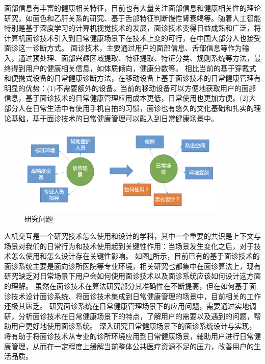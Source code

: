 
面部信息有丰富的健康相关特征\cite{ding2019reading}，目前也有大量关注面部信息和健康相关性的理论研究，如面色和乙肝关系的研究\cite{吴秀艳2014108}、基于舌部特征判断慢性肾衰竭\cite{周小芳2018慢性肾衰患者虚兼湿浊证的口唇特征研究}等。随着人工智能特别是基于深度学习的计算机视觉技术\cite{hassaballah2020deep}的发展，面诊技术变得日益成熟和广泛，将计算机面诊技术引入到日常健康场景下在技术上变的可行，在中国大部分人也接受面诊这一诊断方式。
面诊技术，主要通过用户的面部信息、舌部信息等作为输入，通过预处理、面部兴趣区域提取、特征提取、特征分类、规则系统等方法，最终得到用户的健康相关信息，如体质倾向，健康分数等\cite{林锋2019中医面诊系统调研报告}。
相比当前的基于穿戴式和便携式设备的日常健康诊断方法，在移动设备上基于面诊技术的日常健康管理有明显的优势：(1)不需要额外的设备。当前的移动设备可以方便地获取用户的面部信息，基于面诊技术的日常健康管理应用成本更低，日常使用也更加方便。(2)大部分人在日常生活中有使用手机自拍的习惯，面诊也有悠久的文化基础和扎实的理论基础，基于面诊技术的日常健康管理可以融入到日常健康场景中。

\begin{figure}
    \centering
    \includegraphics[width=10cm]{images/scenario.png}
    \caption{研究问题}
    \label{fig:scenario}
\end{figure}

人机交互是一个研究技术怎么使用和设计的学科，其中一个重要的共识是上下文与场景对我们的日常行为和技术使用起到关键性作用：当场景发生变化之后，对于技术怎么使用和怎么设计存在关键性影响\cite{1987Plans}。
如图\ref{fig:scenario}所示，目前已有的基于面诊技术的面诊系统主要是面向诊所医院等专业环境，相关研究也都集中在面诊算法上，现有研究缺乏对日常场景下用户会如何使用面诊技术以及面诊系统应该如何设计这方面的理解。
虽然在面诊技术在算法研究部分其准确性在不断提高，但在如何基于面诊技术设计面诊系统、将面诊技术集成到日常健康管理的场景中，目前相关的工作还极其匮乏。
研究面诊系统在日常健康管理场景下的应用问题，需要通过实地调研，分析面诊技术在日常健康场景下的特点，了解用户的需要以及遇到的问题，帮助用户更好地使用面诊系统。
深入研究日常健康场景下的面诊系统设计与实现，将有助于将面诊技术从专业的诊所环境应用到日常健康场景，辅助用户进行日常健康管理，从而在一定程度上缓解当前整体公共医疗资源不足的压力，改善用户的生活品质。

